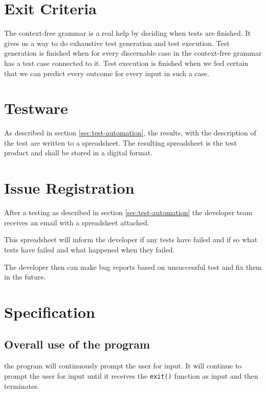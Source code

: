 \documentclass[11pt,a4paper]{article}
\begin{document}
\section{Exit Criteria}

The context-free grammar is a real help by deciding when tests are finished. It gives us a way to do exhaustive test generation and test execution.
Test generation is finished when for every discernable case in the context-free grammar has a test case connected to it.
Test execution is finished when we feel certain that we can predict every outcome for every input in such a case.



\section{Testware}

As described in section \ref{sec:test-automation}, the results, with
the description of the test are written to a spreadsheet. The
resulting spreadsheet is the test product and shall be stored in a
digital format.


\section{Issue Registration}

After a testing as described in section \ref{sec:test-automation} the
developer team receives an email with a spreadsheet attached.

This spreadsheet will inform the developer if any tests have failed
and if so what tests have failed and what happened when they failed.

The developer then can make bug reports based on unsuccessful test and
fix them in the future.


\appendix
\section{Specification} \label{app:specification}
\subsection{Overall use of the program}
the program will continuously prompt the user for input. It will
continue to prompt the user for input until it receives the
\texttt{exit()} function as input and then terminates.
\end{document}

